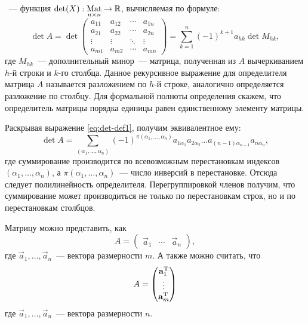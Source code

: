 	~--- функция $\det(X):\underset{n \times n}{\text{Mat}} \rightarrow \mathbb{R}$, вычисляемая по формуле:
	\begin{equation}
		\det A = \det
		\begin{pmatrix}
			a_{11} & a_{12} & \cdots & a_{1n}\\
			a_{21} & a_{22} & \cdots & a_{2n}\\
			\vdots & \vdots & \ddots & \vdots\\
			a_{m1} & a_{m2} & \cdots & a_{mn}
		\end{pmatrix} = 
		\sum\limits_{k = 1}^n (-1)^{k+1} a_{hk} \det M_{hk},
		\label{eq:det-def1}
	\end{equation}
	где $M_{hk}$~--- дополнительный минор~--- матрица, полученная из $A$ вычеркиванием $h$-й строки и $k$-го столбца. Данное рекурсивное выражение для определителя матрица $A$ называется разложением по $h$-й строке, аналогично определяется разложение по столбцу. Для формальной полноты определения скажем, что определитель матрицы порядка единицы равен единственному элементу матрицы.
	
	Раскрывая выражение \eqref{eq:det-def1}, получим эквивалентное ему:
	\begin{equation}
		\det A = \sum\limits_{(\alpha_1, \ldots, \alpha_n)} (-1)^{\pi(\alpha_1, \ldots, \alpha_n)} a_{1\alpha_1} a_{2\alpha_2} \ldots a_{(n-1)\alpha_{n-1}} a_{n\alpha_n},	
		\label{eq:det_def2}
	\end{equation}
	где суммирование производится по всевозможным перестановкам индексов $(\alpha_1, \ldots, \alpha_n)$, а $\pi(\alpha_1, \ldots, \alpha_n)$~--- число инверсий в перестановке. Отсюда следует полилинейность определителя. Перегруппировкой членов получим, что суммирование может производиться не только по перестановкам строк, но и по перестановкам столбцов.
	
	Матрицу можно представить, как
	\begin{equation}
		A = \begin{pmatrix}
			\vec{a}_1 & \cdots & \vec{a}_n
		\end{pmatrix},
	\end{equation}
	где $\vec{a}_1, \ldots, \vec{a}_n$~--- вектора размерности $m$. А также можно считать, что 
	\begin{equation}
		A = \begin{pmatrix}
			\mathbf{a}_1^{\operatorname{T}}\\
			\vdots\\
			\mathbf{a}_m^{\operatorname{T}}
		\end{pmatrix}
	\end{equation}
	где $\vec{a}_1, \ldots, \vec{a}_n$~--- вектора размерности $n$.
	
